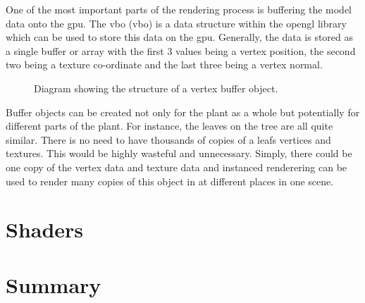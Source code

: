 One of the most important parts of the rendering process is buffering the model data onto the \acrshort{gpu}. The \acrlong{vbo} (\acrshort{vbo}) is a data structure within the \acrshort{opengl} library which can be used to store this data on the \acrshort{gpu}. Generally, the data is stored as a single buffer or array with the first 3 values being a vertex position, the second two being a texture co-ordinate and the last three being a vertex normal. 

\begin{figure}[htbp]
	{\centering
		\vspace{7px}
		\setlength{\fboxrule}{1pt}
		\caption{Diagram showing the structure of a vertex buffer object.}
	}
\end{figure}
\FloatBarrier

Buffer objects can be created not only for the plant as a whole but potentially for different parts of the plant. For instance, the leaves on the tree are all quite similar. There is no need to have thousands of copies of a leafs vertices and textures. This would be highly wasteful and unnecessary. Simply, there could be one copy of the vertex data and texture data and instanced renderering can be used to render many copies of this object in at different places in one scene. 

\section{Shaders}

\section{Summary}








